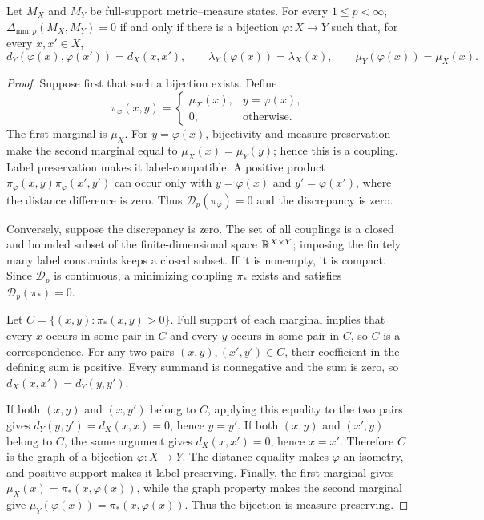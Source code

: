 \begin{theorem}
Let $M_X$ and $M_Y$ be full-support metric--measure states. For every
$1\leq p<\infty$,
$\Delta_{\mathrm{mm},p}(M_X,M_Y)=0$ if and only if there is a bijection
$\varphi:X\to Y$ such that, for every $x,x'\in X$,
\[
 d_Y(\varphi(x),\varphi(x'))=d_X(x,x'),\qquad
 \lambda_Y(\varphi(x))=\lambda_X(x),\qquad
 \mu_Y(\varphi(x))=\mu_X(x).
\]
\end{theorem}

\begin{proof}
Suppose first that such a bijection exists. Define
\[
 \pi_\varphi(x,y)=
 \begin{cases}
  \mu_X(x),&y=\varphi(x),\\
  0,&\text{otherwise}.
 \end{cases}
\]
The first marginal is $\mu_X$. For $y=\varphi(x)$, bijectivity and
measure preservation make the second marginal equal to
$\mu_X(x)=\mu_Y(y)$; hence this is a coupling. Label preservation makes
it label-compatible. A positive product
$\pi_\varphi(x,y)\pi_\varphi(x',y')$ can occur only with
$y=\varphi(x)$ and $y'=\varphi(x')$, where the distance difference is
zero. Thus $\mathcal D_p(\pi_\varphi)=0$ and the discrepancy is zero.

Conversely, suppose the discrepancy is zero. The set of all couplings is a
closed and bounded subset of the finite-dimensional space
$\mathbb{R}^{X\times Y}$; imposing the finitely many label constraints keeps a
closed subset. If it is nonempty, it is compact. Since $\mathcal D_p$ is
continuous, a minimizing coupling $\pi_*$ exists and satisfies
$\mathcal D_p(\pi_*)=0$.

Let $C=\{(x,y):\pi_*(x,y)>0\}$. Full support of each marginal implies
that every $x$ occurs in some pair in $C$ and every $y$ occurs in some pair in
$C$, so $C$ is a correspondence. For any two pairs
$(x,y),(x',y')\in C$, their coefficient in the defining sum is positive.
Every summand is nonnegative and the sum is zero, so
$d_X(x,x')=d_Y(y,y')$.

If both $(x,y)$ and $(x,y')$ belong to $C$, applying this equality to the two
pairs gives $d_Y(y,y')=d_X(x,x)=0$, hence $y=y'$. If both $(x,y)$ and
$(x',y)$ belong to $C$, the same argument gives $d_X(x,x')=0$, hence
$x=x'$. Therefore $C$ is the graph of a bijection $\varphi:X\to Y$.
The distance equality makes $\varphi$ an isometry, and positive support
makes it label-preserving. Finally, the first marginal gives
$\mu_X(x)=\pi_*(x,\varphi(x))$, while the graph property makes the
second marginal give
$\mu_Y(\varphi(x))=\pi_*(x,\varphi(x))$. Thus the bijection is
measure-preserving.
\end{proof}


